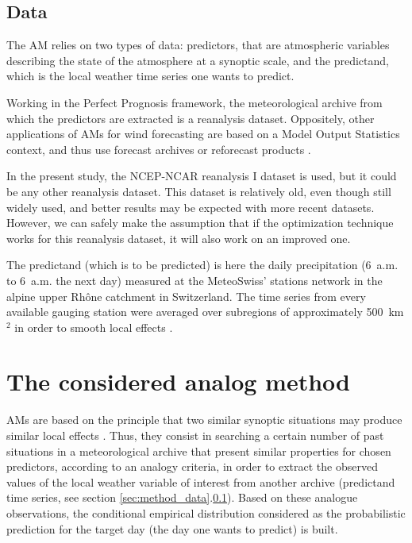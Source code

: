 \documentclass{ametsoc}
\begin{document}
\subsection{Data}
\label{sec:data}

The AM relies on two types of data: predictors, that are atmospheric variables describing the state of the atmosphere at a synoptic scale, and the predictand, which is the local weather time series one wants to predict.

Working in the Perfect Prognosis framework, the meteorological archive from which the predictors are extracted is a reanalysis dataset. Oppositely, other applications of AMs for wind forecasting are based on a Model Output Statistics \citep[MOS, see][]{Glahn1972} context, and thus use forecast archives or reforecast products \citep[e.g.][]{DelleMonache2013, DelleMonache2011, Alessandrini2015, Junk2015, Junk2015c}.

In the present study, the NCEP-NCAR reanalysis I dataset \citep[6-hourly, 17 pressure levels at a resolution of 2.5\degree, see][]{Kalnay1996} is used, but it could be any other reanalysis dataset. This dataset is relatively old, even though still widely used, and better results may be expected with more recent datasets. However, we can safely make the assumption that if the optimization technique works for this reanalysis dataset, it will also work on an improved one.

The predictand (which is to be predicted) is here the daily precipitation (6~a.m. to 6~a.m. the next day) measured at the MeteoSwiss' stations network in the alpine upper Rh\^{o}ne catchment in Switzerland. The time series from every available gauging station were averaged over subregions of approximately 500~km$^{2}$ \citep[see][for the details]{Horton2012a} in order to smooth local effects \citep{Obled2002, Marty2012}.


\section{The considered analog method}
\label{sec:am}

AMs are based on the principle that two similar synoptic situations may produce similar local effects \citep{Lorenz1956, Lorenz1969}. Thus, they consist in searching a certain number of past situations in a meteorological archive that present similar properties for chosen predictors, according to an analogy criteria, in order to extract the observed values of the local weather variable of interest from another archive (predictand time series, see section \ref{sec:method_data}.\ref{sec:data}). Based on these analogue observations, the conditional empirical distribution considered as the probabilistic prediction for the target day (the day one wants to predict) is built.
\end{document}
